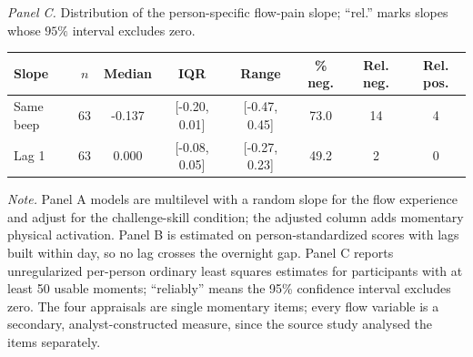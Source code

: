 \begin{table}[!htbp]
\par\vspace{6pt}\noindent\textit{Panel C.} Distribution of the person-specific flow-pain slope; ``rel.'' marks slopes whose $95\%$ interval excludes zero.\par\vspace{2pt}
\begin{tabular*}{\textwidth}{@{\extracolsep{\fill}}lccccccc@{}}
\toprule
Slope & $n$ & Median & IQR & Range & \% neg. & Rel. neg. & Rel. pos. \\
\midrule
Same beep & 63 & -0.137 & [-0.20, 0.01] & [-0.47, 0.45] & 73.0 & 14 & 4 \\
Lag 1 & 63 & 0.000 & [-0.08, 0.05] & [-0.27, 0.23] & 49.2 & 2 & 0 \\
\bottomrule
\end{tabular*}
\par\vspace{3pt}\noindent\parbox{\textwidth}{\footnotesize\textit{Note.} Panel A models are multilevel with a random slope for the flow experience and adjust for the challenge-skill condition; the adjusted column adds momentary physical activation. Panel B is estimated on person-standardized scores with lags built within day, so no lag crosses the overnight gap. Panel C reports unregularized per-person ordinary least squares estimates for participants with at least 50 usable moments; ``reliably'' means the 95\% confidence interval excludes zero. The four appraisals are single momentary items; every flow variable is a secondary, analyst-constructed measure, since the source study analysed the items separately.}
\endgroup
\end{table}
